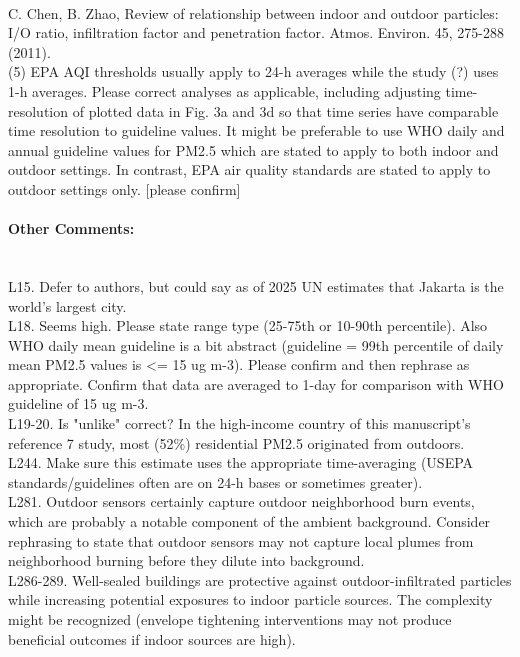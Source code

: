 \documentclass[12pt,english]{article}
\begin{document}
\\
C. Chen, B. Zhao, Review of relationship between indoor and outdoor particles: I/O ratio, infiltration factor and penetration factor. Atmos. Environ. 45, 275-288 (2011).
\\
(5) EPA AQI thresholds usually apply to 24-h averages while the study (?) uses 1-h averages. Please correct analyses as applicable, including adjusting time-resolution of plotted data in Fig. 3a and 3d so that time series have comparable time resolution to guideline values. It might be preferable to use WHO daily and annual guideline values for PM2.5 which are stated to apply to both indoor and outdoor settings. In contrast, EPA air quality standards are stated to apply to outdoor settings only. [please confirm]
\\

\paragraph{Other Comments:}
\\
L15. Defer to authors, but could say as of 2025 UN estimates that Jakarta is the world's largest city.
\\
L18. Seems high. Please state range type (25-75th or 10-90th percentile). Also WHO daily mean guideline is a bit abstract (guideline = 99th percentile of daily mean PM2.5 values is <= 15 ug m-3). Please confirm and then rephrase as appropriate. Confirm that data are averaged to 1-day for comparison with WHO guideline of 15 ug m-3.
\\
L19-20. Is "unlike" correct? In the high-income country of this manuscript's reference 7 study, most (52\%) residential PM2.5 originated from outdoors.
\\
L244. Make sure this estimate uses the appropriate time-averaging (USEPA standards/guidelines often are on 24-h bases or sometimes greater).
\\
L281. Outdoor sensors certainly capture outdoor neighborhood burn events, which are probably a notable component of the ambient background. Consider rephrasing to state that outdoor sensors may not capture local plumes from neighborhood burning before they dilute into background.
\\
L286-289. Well-sealed buildings are protective against outdoor-infiltrated particles while increasing potential exposures to indoor particle sources. The complexity might be recognized (envelope tightening interventions may not produce beneficial outcomes if indoor sources are high).
\\
\end{document}
